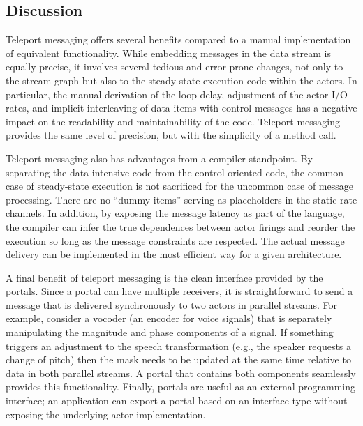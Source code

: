 
\subsection*{Discussion}

Teleport messaging offers several benefits compared to a manual
implementation of equivalent functionality.  While embedding messages
in the data stream is equally precise, it involves several tedious
and error-prone changes, not only to the stream graph but also to the
steady-state execution code within the actors.  In particular, the
manual derivation of the loop delay, adjustment of the actor I/O
rates, and implicit interleaving of data items with control messages
has a negative impact on the readability and maintainability of the
code.  Teleport messaging provides the same level of precision, but
with the simplicity of a method call.

Teleport messaging also has advantages from a compiler standpoint.  By
separating the data-intensive code from the control-oriented code, the
common case of steady-state execution is not sacrificed for
the uncommon case of message processing.  There are no ``dummy items''
serving as placeholders in the static-rate channels.  In addition, by
exposing the message latency as part of the language, the compiler can
infer the true dependences between actor firings and reorder the
execution so long as the message constraints are respected.  The
actual message delivery can be implemented in the most efficient way
for a given architecture.

A final benefit of teleport messaging is the clean interface provided
by the portals.  Since a portal can have multiple receivers, it is
straightforward to send a message that is delivered synchronously to
two actors in parallel streams.  For example, consider a vocoder (an
encoder for voice signals) that is separately manipulating the
magnitude and phase components of a signal.  If something triggers an
adjustment to the speech transformation (e.g., the speaker
requests a change of pitch) then the mask needs to be updated at the
same time relative to data in both parallel streams.  A portal that
contains both components seamlessly provides this functionality.
Finally, portals are useful as an external programming interface; an
application can export a portal based on an interface type without
exposing the underlying actor implementation.

